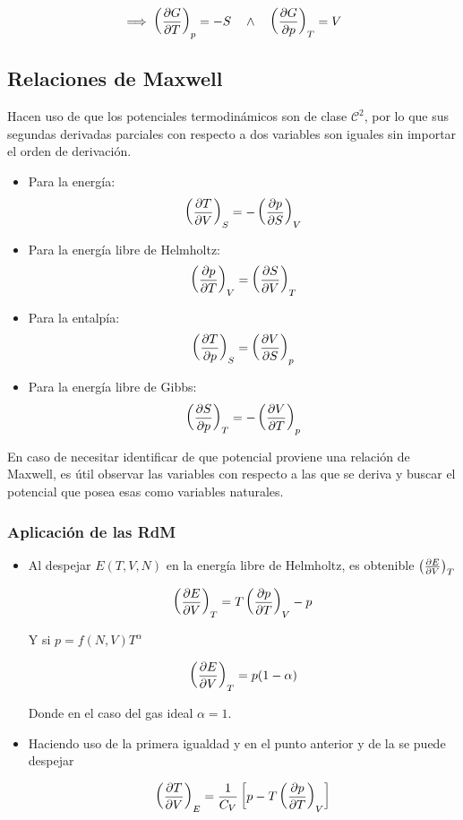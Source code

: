 \[\implies \devtermo{p}{G}{T} = -S \quad \land \quad \devtermo{T}{G}{p} = V\]

\subsection{Relaciones de Maxwell} 
\label{relaciones-maxwell}
Hacen uso de que los potenciales termodinámicos son de clase $\mathcal{C}^2$, por lo que sus segundas derivadas parciales con respecto a dos variables son iguales sin importar el orden de derivación. 

\begin{itemize}
    \item Para la energía:
    \[\devtermo{S}{T}{V} = -\devtermo{V}{p}{S}\]
    \item Para la energía libre de Helmholtz:
    \[\devtermo{V}{p}{T} = \devtermo{T}{S}{V}\]
    \item Para la entalpía:
    \[ \devtermo{S}{T}{p} = \devtermo{p}{V}{S} \]
    \item Para la energía libre de Gibbs:
    \[\devtermo{T}{S}{p}=-\devtermo{p}{V}{T}\]
\end{itemize}

En caso de necesitar identificar de que potencial proviene una relación de Maxwell, es útil observar las variables con respecto a las que se deriva y buscar el potencial que posea esas como variables naturales.

\subsubsection{Aplicación de las RdM} 

\begin{itemize}

\item Al despejar $E(T,V,N)$ en la energía libre de Helmholtz, es obtenible $\devtermo{T}{E}{V}$

\[\devtermo{T}{E}{V} = T\devtermo{V}{p}{T} -p\]

Y si $p = f(N,V)T^\alpha$

\[\devtermo{T}{E}{V} = p(1-\alpha)\]

Donde en el caso del gas ideal $\alpha = 1$.

\item Haciendo uso de la primera igualdad y en el punto anterior y de la  se puede despejar 

\[ \devtermo{E}{T}{V} = \frac{1}{C_V}\lados{[}{p - T\devtermo{V}{p}{T}} \]
\end{itemize}

